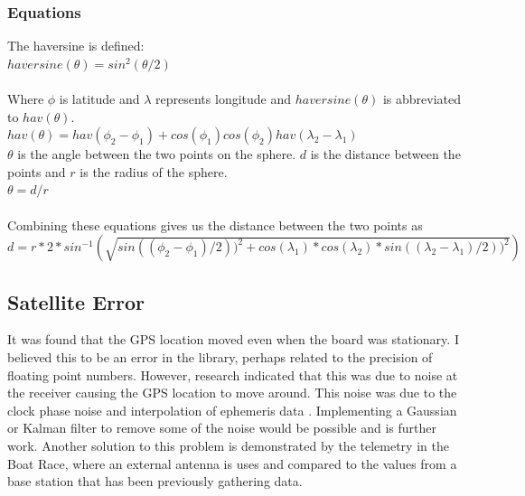 \documentclass[12pt,a4paper]{report}
\begin{document}
\subsubsection{Equations}
The haversine is defined: \\
$haversine(\theta) = sin^2(\theta/2)$ \\ \\ 
Where $\phi$ is latitude and $\lambda$ represents longitude and $haversine(\theta)$ is abbreviated to $hav(\theta)$. \\
$hav(\theta) = hav(\phi_2 - \phi_1) + cos(\phi_1) cos(\phi_2) hav(\lambda_2 - \lambda_1)$ \\
$\theta$ is the angle between the two points on the sphere. $d$ is the distance between the points and $r$ is the radius of the sphere. \\
$\theta = d / r$ \\ \\ 
Combining these equations gives us the distance between the two points as \\
$d = r * 2 * sin^{-1}(\sqrt{sin((\phi_2 - \phi_1)/2))^2 + cos(\lambda_1) * cos(\lambda_2) * sin((\lambda_2 - \lambda_1)/2))^2})$

\subsection{Satellite Error}
It was found that the GPS location moved even when the board was stationary. I believed this to be an error in the library, perhaps related to the precision of floating point numbers. However, research indicated that this was due to noise at the receiver causing the GPS location to move around. This noise was due to the clock phase noise and interpolation of ephemeris data \cite{satellite}. Implementing a Gaussian or Kalman filter to remove some of the noise would be possible and is further work. Another solution to this problem is demonstrated by the telemetry in the Boat Race, where an external antenna is uses and compared to the values from a base station that has been previously gathering data.  %
 
\end{document}
